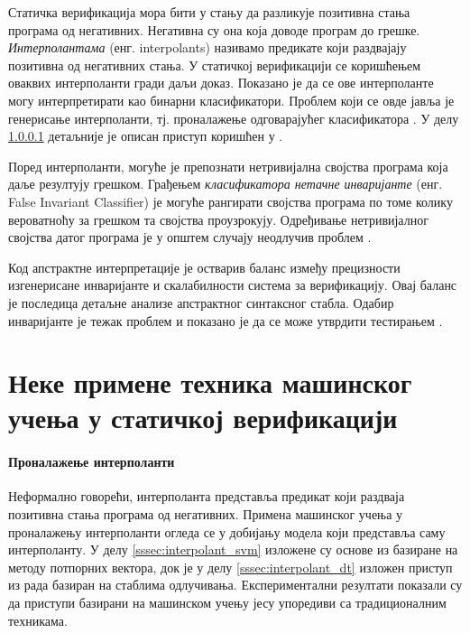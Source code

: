 \documentclass[a4paper]{article}
\begin{document}
{Статичка верификација мора бити у стању да разликује позитивна стања програма од негативних.
Негативна су она која доводе програм до грешке. \textit{Интерполантама} (енг. interpolants)
називамо предикате који раздвајају позитивна од негативних стања.
У статичкој верификацији се коришћењем оваквих интерполанти гради даљи доказ.
Показано је да се ове интерполанте могу интерпретирати као бинарни класификатори.
Проблем који се овде јавља је генерисање интерполанти, тј. проналажење одговарајућег класификатора \cite{Sharma_interpolantsas}.
У делу  \ref{ssec:interpolant} детаљније је описан приступ коришћен у \cite{Sharma_interpolantsas}.

Поред интерполанти, могуће је препознати нетривијална својства програма која даље резултују грешком.
Грађењем \textit{класификатора нетачне инваријанте} (енг. False Invariant Classifier) је могуће рангирати
својства програма по томе колику вероватноћу за грешком та својства проузрокују.
Одређивање нетривијалног својства датог програма је у општем случају неодлучив проблем \cite{turing, Brun04findinglatent}.

Код апстрактне интерпретације је остварив баланс између прецизности изгенерисане инваријанте и скалабилности система за верификацију. Овај баланс је последица детаљне анализе апстрактног синтаксног стабла. Одабир инваријанте је тежак проблем и показано је да се може утврдити тестирањем \cite{Sharma_interpolantsas, KrishnaPW15}.


\section{Неке примене техника машинског учења у статичкој верификацији}
\label{sec:primene}

\paragraph{Проналажење интерполанти}
\label{ssec:interpolant}

Неформално говорећи, интерполанта представља предикат који раздваја позитивна стања програма
од негативних. Примена машинског учења у проналажењу интерполанти огледа се у добијању модела
који представља саму интерполанту. У делу \ref{sssec:interpolant_svm} изложене су основе из \cite{Sharma_interpolantsas} базиране на методу
потпорних вектора, док је у делу \ref{sssec:interpolant_dt} изложен приступ из рада \cite{KrishnaPW15} базиран на стаблима одлучивања. Експериментални резултати
показали су да приступи базирани на машинском учењу јесу упоредиви са традиционалним техникама.

}
\end{document}
